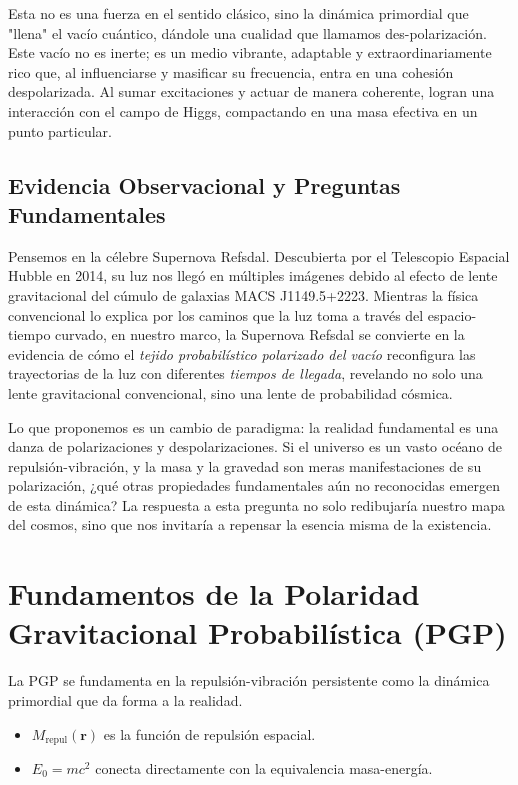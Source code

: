 \documentclass{book} %
\begin{document}
Esta no es una fuerza en el sentido clásico, sino la dinámica primordial que "llena" el vacío cuántico, dándole una cualidad que llamamos des-polarización. Este vacío no es inerte; es un medio vibrante, adaptable y extraordinariamente rico que, al influenciarse y masificar su frecuencia, entra en una cohesión despolarizada. Al sumar excitaciones y actuar de manera coherente, logran una interacción con el campo de Higgs, compactando en una masa efectiva en un punto particular.

\section{Evidencia Observacional y Preguntas Fundamentales}
Pensemos en la célebre Supernova Refsdal. Descubierta por el Telescopio Espacial Hubble en 2014, su luz nos llegó en múltiples imágenes debido al efecto de lente gravitacional del cúmulo de galaxias MACS J1149.5+2223. Mientras la física convencional lo explica por los caminos que la luz toma a través del espacio-tiempo curvado, en nuestro marco, la Supernova Refsdal se convierte en la evidencia de cómo el \textit{tejido probabilístico polarizado del vacío} reconfigura las trayectorias de la luz con diferentes \textit{tiempos de llegada}, revelando no solo una lente gravitacional convencional, sino una lente de probabilidad cósmica.

Lo que proponemos es un cambio de paradigma: la realidad fundamental es una danza de polarizaciones y despolarizaciones. Si el universo es un vasto océano de repulsión-vibración, y la masa y la gravedad son meras manifestaciones de su polarización, ¿qué otras propiedades fundamentales aún no reconocidas emergen de esta dinámica? La respuesta a esta pregunta no solo redibujaría nuestro mapa del cosmos, sino que nos invitaría a repensar la esencia misma de la existencia.

\chapter{Fundamentos de la Polaridad Gravitacional Probabilística (PGP)}
La PGP se fundamenta en la repulsión-vibración persistente como la dinámica primordial que da forma a la realidad.
\begin{itemize}
    \item $M_{\text{repul}}(\mathbf{r})$ es la función de repulsión espacial.
    \item $E_0 = mc^2$ conecta directamente con la equivalencia masa-energía.
\end{itemize}
\end{document}
